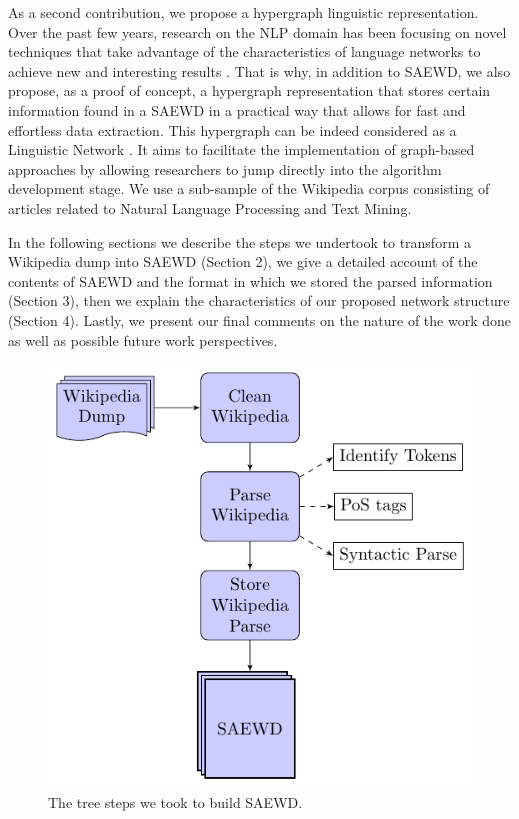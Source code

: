 As a second contribution, we propose a hypergraph linguistic representation. Over the past few years, research on the NLP domain has been focusing on novel techniques that take advantage of the characteristics of language networks to achieve new and interesting results \cite{Mihalcea11}. That is why, in addition to SAEWD, we also propose, as a proof of concept, a hypergraph representation that stores certain information found in a SAEWD in a practical way that allows for fast and effortless data extraction. This hypergraph can be indeed considered as a Linguistic Network \cite{Choudhury09}.  It aims to facilitate the implementation of graph-based approaches by allowing researchers to jump directly into the algorithm development stage. We use a sub-sample of the Wikipedia corpus consisting of articles related to Natural Language Processing and Text Mining. 

In the following sections we describe the steps we undertook to transform a Wikipedia dump into SAEWD (Section 2), we give a detailed account of the contents of SAEWD and the format in which we stored the parsed information (Section 3), then we explain the characteristics of our proposed network structure (Section 4). Lastly, we present our final comments on the nature of the work done as well as possible future work perspectives.




\begin{figure}[t]

	\centering
	\includegraphics[scale=.8]{images/Chapitre7/flow_chart.pdf}
	\caption{The tree steps we took to build SAEWD.}
	\label{fig:flow}

\end{figure}

